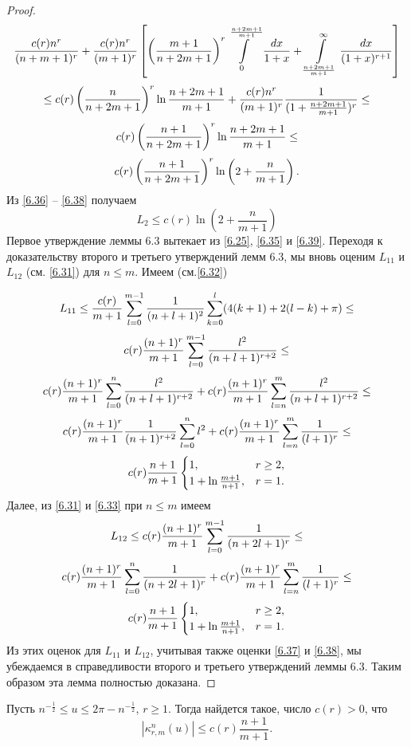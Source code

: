 \begin{proof}
$$$$
$$
{c(r)n^r\over(n+m+1)^{r}}+{c(r)n^r\over(m+1)^{r}}\left[\left({m+1\over n+2m+1}\right)^r\int\limits_{0}^\frac{n+2m+1}{m+1}{dx\over 1+x}+\int\limits_\frac{n+2m+1}{m+1}^\infty{dx\over(1+x)^{r+1}}\right]
$$
$$
\le c(r)\left({n\over n+2m+1}\right)^r\ln\frac{n+2m+1}{m+1}+{c(r)n^r\over(m+1)^{r}}{1\over(1+\frac{n+2m+1}{m+1})^r}\le
$$
$$
c(r)\left({n+1\over n+2m+1}\right)^r\ln\frac{n+2m+1}{m+1}\le
$$
\begin{equation}\label{6.38}
    c(r)\left({n+1\over n+2m+1}\right)^r\ln\left(2+\frac{n}{m+1}\right).
\end{equation}
Из \eqref{6.36} -- \eqref{6.38} получаем
\begin{equation}\label{6.39}
    L_2\le  c(r)\ln\left(2+\frac{n}{m+1}\right)
\end{equation}
Первое утверждение леммы 6.3 вытекает из \eqref{6.25}, \eqref{6.35} и \eqref{6.39}. Переходя к доказательству второго и третьего утверждений  лемм 6.3, мы вновь оценим $L_{11}$  и $L_{12}$ (см. \eqref{6.31}) для $n\le m$.  Имеем (см.\eqref{6.32})

$$
  L_{11}\le
  {c(r)\over m+1}\sum_{l=0}^{m-1}\frac{1}{(n+l+1)^{2}}\sum\limits_{k=0}^l(4(k+1)+2(l-k)+\pi)\le
  $$
$$
    c(r){(n+1)^r\over m+1}\sum_{l=0}^{m-1}\frac{l^2}{(n+l+1)^{r+2}}\le
$$
$$
    c(r){(n+1)^r\over m+1}\sum_{l=0}^n\frac{l^2}{(n+l+1)^{r+2}}+
   c(r){(n+1)^r\over m+1}\sum_{l=n}^m\frac{l^2}{(n+l+1)^{r+2}}\le
$$
$$
    c(r){(n+1)^r\over m+1}\frac{1}{(n+1)^{r+2}}\sum_{l=0}^nl^2+
   c(r){(n+1)^r\over m+1}\sum_{l=n}^m\frac{1}{(l+1)^{r}}\le
$$
$$
c(r){n+1\over m+1}\begin{cases}1,&\text{$r\ge2$},\\1+\ln{m+1\over n+1},&\text{$r=1$.}\end{cases}
$$
Далее, из \eqref{6.31} и \eqref{6.33} при $n\le m$ имеем
$$
L_{12}\le c(r){(n+1)^r\over m+1}\sum_{l=0}^{m-1}\frac{1}{(n+2l+1)^r}\le
$$
$$
    c(r){(n+1)^r\over m+1}\sum_{l=0}^n\frac{1}{(n+2l+1)^r}+
   c(r){(n+1)^r\over m+1}\sum_{l=n}^m\frac{1}{(l+1)^{r}}\le
$$
$$
c(r){n+1\over m+1}\begin{cases}1,&\text{$r\ge2$},\\1+\ln{m+1\over n+1},&\text{$r=1$.}\end{cases}
$$
Из этих оценок для $L_{11}$ и $L_{12}$, учитывая также оценки \eqref{6.37} и \eqref{6.38}, мы убеждаемся в справедливости второго и третьего
утверждений леммы 6.3. Таким образом эта лемма полностью доказана.
\end{proof}

\begin{lemma}\label{l6.4}
 Пусть  $n^{-\frac12}\le u\le2\pi-n^{-\frac12}$, $r\ge1$. Тогда найдется такое,  число $c(r)>0$, что
 $$|\kappa_{r,m}^{n}(u)|\le c(r)\frac{n+1}{m+1}.$$
  \end{lemma}

